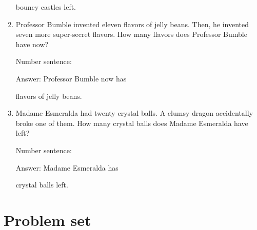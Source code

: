 \documentclass{tufte-book}
\begin{document}
\begin{enumerate}
  bouncy castles left.
\item
  Professor Bumble invented eleven flavors of jelly beans. Then, he
  invented seven more super-secret flavors. How many flavors does
  Professor Bumble have now?\medskip\par
  Number sentence:
  \dotfill\medskip\par
  Answer: Professor Bumble now has
  \dotfill\medskip\par\mbox{}\dotfill\medskip\par\mbox{}\dotfill\bigskip
  flavors of jelly beans.
\item
  Madame Esmeralda had twenty crystal balls. A clumsy dragon
  accidentally broke one of them. How many crystal balls does Madame
  Esmeralda have left?\medskip\par
  Number sentence:
  \dotfill\medskip\par
  Answer: Madame Esmeralda has
  \dotfill\medskip\par\mbox{}\dotfill\medskip\par\mbox{}\dotfill\bigskip
  crystal balls left.
\end{enumerate}



\clearpage\section{Problem set }
\end{document}
